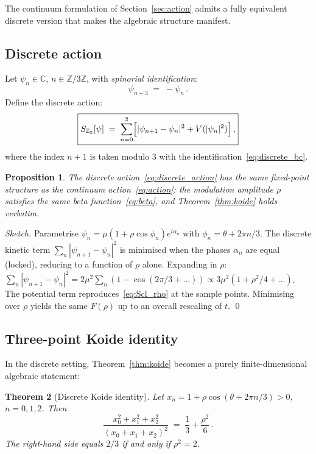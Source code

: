 \documentclass[12pt,a4paper]{article}
\newtheorem{theorem}{Theorem}
\newtheorem{proposition}[theorem]{Proposition}
\theoremstyle{definition}
\newcommand{\Z}{\mathbb{Z}}
\newcommand{\C}{\mathbb{C}}
\begin{document}
The continuum formulation of Section~\ref{sec:action} admits a fully equivalent
discrete version that makes the algebraic structure manifest.

\subsection{Discrete action}

Let $\psi_n \in \C$, $n \in \Z/3\Z$, with \emph{spinorial identification}:
\begin{equation}
  \label{eq:discrete_bc}
  \psi_{n+3} \;=\; -\psi_n\,.
\end{equation}
Define the discrete action:
\begin{equation}
  \label{eq:discrete_action}
  \boxed{
  S_{\Z_3}[\psi] \;=\;
  \sum_{n=0}^{2}\Bigl[|\psi_{n+1}-\psi_n|^2 + V(|\psi_n|^2)\Bigr]\,,}
\end{equation}
where the index $n+1$ is taken modulo 3 with the identification~\eqref{eq:discrete_bc}.

\begin{proposition}
The discrete action~\eqref{eq:discrete_action} has the same fixed-point structure
as the continuum action~\eqref{eq:action}: the modulation amplitude $\rho$ satisfies
the same beta function~\eqref{eq:beta}, and Theorem~\ref{thm:koide} holds verbatim.
\end{proposition}

\begin{proof}[Sketch]
Parametrise $\psi_n = \mu(1+\rho\cos\phi_n)e^{i\alpha_n}$ with
$\phi_n = \theta + 2\pi n/3$.
The discrete kinetic term $\sum_n|\psi_{n+1}-\psi_n|^2$ is minimised when the
phases $\alpha_n$ are equal (locked), reducing to a function of $\rho$ alone.
Expanding in $\rho$:
$\sum_n|\psi_{n+1}-\psi_n|^2 = 2\mu^2\sum_n(1-\cos(2\pi/3+\ldots)) \propto 3\mu^2(1+\rho^2/4+\ldots)$.
The potential term reproduces~\eqref{eq:Scl_rho} at the sample points.
Minimising over $\rho$ yields the same $F(\rho)$ up to an overall rescaling of $t$.
\qed
\end{proof}

\subsection{Three-point Koide identity}

In the discrete setting, Theorem~\ref{thm:koide} becomes a purely finite-dimensional
algebraic statement:

\begin{theorem}[Discrete Koide identity]
\label{thm:discrete_koide}
Let $x_n = 1 + \rho\cos(\theta + 2\pi n/3) > 0$, $n = 0,1,2$.
Then
\begin{equation}
  \frac{x_0^2 + x_1^2 + x_2^2}{(x_0 + x_1 + x_2)^2}
  \;=\; \frac{1}{3} + \frac{\rho^2}{6}\,.
\end{equation}
The right-hand side equals $2/3$ if and only if $\rho^2 = 2$.
\end{theorem}
\end{document}
